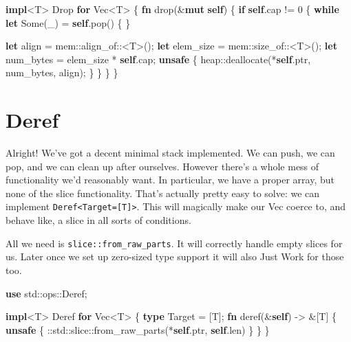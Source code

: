 \documentclass[a4paper,]{book}
\newenvironment{Shaded}{\begin{snugshade}}{\end{snugshade}}
\newcommand{\KeywordTok}[1]{\textcolor[rgb]{0.13,0.29,0.53}{\textbf{{#1}}}}
\newcommand{\DataTypeTok}[1]{\textcolor[rgb]{0.13,0.29,0.53}{{#1}}}
\newcommand{\DecValTok}[1]{\textcolor[rgb]{0.00,0.00,0.81}{{#1}}}
\newcommand{\ConstantTok}[1]{\textcolor[rgb]{0.00,0.00,0.00}{{#1}}}
\newcommand{\BuiltInTok}[1]{{#1}}
\newcommand{\NormalTok}[1]{{#1}}
\begin{document}
\begin{Shaded}
\begin{Highlighting}[]
\KeywordTok{impl}\NormalTok{<T> }\BuiltInTok{Drop} \KeywordTok{for} \DataTypeTok{Vec}\NormalTok{<T> \{}
    \KeywordTok{fn} \NormalTok{drop(&}\KeywordTok{mut} \KeywordTok{self}\NormalTok{) \{}
        \KeywordTok{if} \KeywordTok{self}\NormalTok{.cap != }\DecValTok{0} \NormalTok{\{}
            \KeywordTok{while} \KeywordTok{let} \ConstantTok{Some}\NormalTok{(_) = }\KeywordTok{self}\NormalTok{.pop() \{ \}}

            \KeywordTok{let} \NormalTok{align = mem::align_of::<T>();}
            \KeywordTok{let} \NormalTok{elem_size = mem::size_of::<T>();}
            \KeywordTok{let} \NormalTok{num_bytes = elem_size * }\KeywordTok{self}\NormalTok{.cap;}
            \KeywordTok{unsafe} \NormalTok{\{}
                \NormalTok{heap::deallocate(*}\KeywordTok{self}\NormalTok{.ptr, num_bytes, align);}
            \NormalTok{\}}
        \NormalTok{\}}
    \NormalTok{\}}
\NormalTok{\}}
\end{Highlighting}
\end{Shaded}

\section{Deref}\label{sec--vec-deref}

Alright! We've got a decent minimal stack implemented. We can push, we
can pop, and we can clean up after ourselves. However there's a whole
mess of functionality we'd reasonably want. In particular, we have a
proper array, but none of the slice functionality. That's actually
pretty easy to solve: we can implement
\texttt{Deref\textless{}Target={[}T{]}\textgreater{}}. This will
magically make our Vec coerce to, and behave like, a slice in all sorts
of conditions.

All we need is \texttt{slice::from\_raw\_parts}. It will correctly
handle empty slices for us. Later once we set up zero-sized type support
it will also Just Work for those too.

\begin{Shaded}
\begin{Highlighting}[]
\KeywordTok{use} \NormalTok{std::ops::Deref;}

\KeywordTok{impl}\NormalTok{<T> Deref }\KeywordTok{for} \DataTypeTok{Vec}\NormalTok{<T> \{}
    \KeywordTok{type} \NormalTok{Target = [T];}
    \KeywordTok{fn} \NormalTok{deref(&}\KeywordTok{self}\NormalTok{) -> &[T] \{}
        \KeywordTok{unsafe} \NormalTok{\{}
            \NormalTok{::std::slice::from_raw_parts(*}\KeywordTok{self}\NormalTok{.ptr, }\KeywordTok{self}\NormalTok{.len)}
        \NormalTok{\}}
    \NormalTok{\}}
\NormalTok{\}}
\end{Highlighting}
\end{Shaded}
\end{document}
